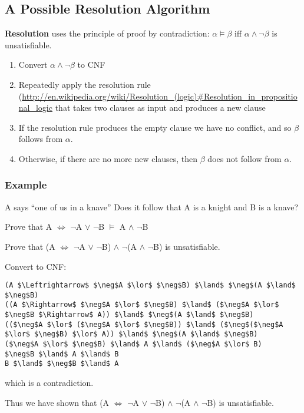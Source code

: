 \subsection{A Possible Resolution Algorithm}
\textbf{Resolution} uses the principle of proof by contradiction: $\alpha
\models \beta$ iff $\alpha \land \neg \beta$ is unsatisfiable.

\begin{enumerate}
    \item Convert $\alpha \land \neg \beta$ to CNF
    \item Repeatedly apply the resolution rule
        (\url{http://en.wikipedia.org/wiki/Resolution_(logic)#Resolution_in_propositional_logic} that takes two clauses as input
        and produces a new clause
    \item If the resolution rule produces the empty clause we have no conflict,
        and so $\beta$ follows from $\alpha$.
    \item Otherwise, if there are no more new clauses, then $\beta$ does not
        follow from $\alpha$.
\end{enumerate}

\subsubsection{Example}
A says ``one of us in a knave'' Does it follow that A is a knight and B is a
knave?

Prove that A $\Leftrightarrow$ $\neg$A $\lor$ $\neg$B $\models$ A $\land$ $\neg$B

Prove that (A $\Leftrightarrow$ $\neg$A $\lor$ $\neg$B) $\land$ $\neg$(A $\land$ $\neg$B) is unsatisfiable.

Convert to CNF:

\begin{lstlisting}
(A $\Leftrightarrow$ $\neg$A $\lor$ $\neg$B) $\land$ $\neg$(A $\land$ $\neg$B)
((A $\Rightarrow$ $\neg$A $\lor$ $\neg$B) $\land$ ($\neg$A $\lor$ $\neg$B $\Rightarrow$ A)) $\land$ $\neg$(A $\land$ $\neg$B)
(($\neg$A $\lor$ ($\neg$A $\lor$ $\neg$B)) $\land$ ($\neg$($\neg$A $\lor$ $\neg$B) $\lor$ A)) $\land$ $\neg$(A $\land$ $\neg$B)
($\neg$A $\lor$ $\neg$B) $\land$ A $\land$ ($\neg$A $\lor$ B)
$\neg$B $\land$ A $\land$ B
B $\land$ $\neg$B $\land$ A
\end{lstlisting}

which is a contradiction.

Thus we have shown that (A $\Leftrightarrow$ $\neg$A $\lor$ $\neg$B) $\land$
$\neg$(A $\land$ $\neg$B) is unsatisfiable.

